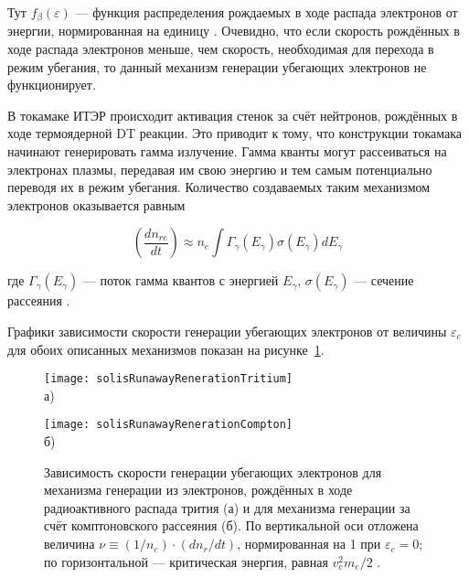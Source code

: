 Тут $ f_{\beta}(\varepsilon) $ --- функция распределения рождаемых в ходе распада электронов от энергии, нормированная на единицу \cite{MartinSolis2017}. Очевидно, что если скорость рождённых в ходе распада электронов меньше, чем скорость, необходимая для перехода в режим убегания, то данный механизм генерации убегающих электронов не функционирует.

В токамаке ИТЭР происходит активация стенок за счёт нейтронов, рождённых в ходе термоядерной DT реакции. Это приводит к тому, что конструкции токамака начинают генерировать гамма излучение. Гамма кванты могут рассеиваться на электронах плазмы, передавая им свою энергию и тем самым потенциально переводя их в режим убегания. Количество создаваемых таким механизмом электронов оказывается равным 

\begin{equation*}
  \left( \frac{ d n_{re} }{ d t } \right) \approx n_e \int \Gamma_{\gamma}(E_{\gamma}) \sigma(E_{\gamma}) d E_{\gamma} 
\end{equation*}

где $\Gamma_{\gamma}(E_{\gamma})$ --- поток гамма квантов с энергией $E_{\gamma}$, $\sigma(E_{\gamma})$ --- сечение рассеяния \cite{MartinSolis2017}.

Графики зависимости скорости генерации убегающих электронов от величины $\varepsilon_c$ для обоих описанных механизмов показан на рисунке~\ref{fig:solisGeneration}.

\begin{figure}[ht]
    \begin{minipage}[b][][b]{0.49\linewidth}\centering
        \texttt{[image: solisRunawayRenerationTritium]} \\ а)
    \end{minipage}
    \hfill
    \begin{minipage}[b][][b]{0.49\linewidth}\centering
        \texttt{[image: solisRunawayRenerationCompton]} \\ б)
    \end{minipage}
    \caption{ Зависимость скорости генерации убегающих электронов для механизма генерации из электронов, рождённых в ходе радиоактивного распада трития (а) и для механизма генерации за счёт комптоновского рассеяния (б). По вертикальной оси отложена величина $\nu \equiv (1/n_e) \cdot ( dn_r / dt ) $, нормированная на 1 при $\varepsilon_c = 0$; по горизонтальной --- критическая энергия, равная $v_c^2 m_e / 2 $ \cite{MartinSolis2017}. }
    \label{fig:solisGeneration}
\end{figure}



